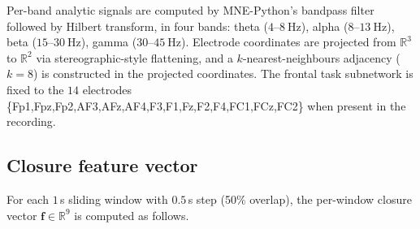 \documentclass[11pt,a4paper]{article}
\begin{document}
Per-band analytic signals are computed by MNE-Python's bandpass filter followed by Hilbert transform, in four bands: theta ($4$--$\SI{8}{\hertz}$), alpha ($8$--$\SI{13}{\hertz}$), beta ($15$--$\SI{30}{\hertz}$), gamma ($30$--$\SI{45}{\hertz}$). Electrode coordinates are projected from $\mathbb{R}^3$ to $\mathbb{R}^2$ via stereographic-style flattening, and a $k$-nearest-neighbours adjacency ($k=8$) is constructed in the projected coordinates. The frontal task subnetwork is fixed to the $14$ electrodes \{Fp1,Fpz,Fp2,AF3,AFz,AF4,F3,F1,Fz,F2,F4,FC1,FCz,FC2\} when present in the recording.

\subsection{Closure feature vector}

For each $1$\,s sliding window with $0.5$\,s step (50\% overlap), the per-window closure vector $\mathbf{f}\in\mathbb{R}^9$ is computed as follows.
\end{document}
